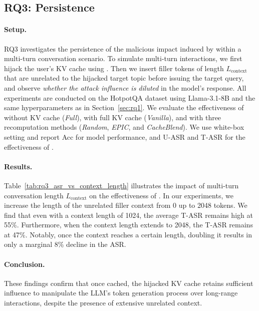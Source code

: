 \subsection{RQ3: Persistence}

\paragraph{Setup.} 
RQ3 investigates the persistence of the malicious impact induced by \sys within a multi-turn conversation scenario. 
% 
To simulate multi-turn interactions, we first hijack the user's KV cache using \sys. Then we insert filler tokens of length $L_\mathrm{context}$ that are unrelated to the hijacked target topic before issuing the target query, and observe \emph{whether the attack influence is diluted} in the model's response.
% 
All experiments are conducted on the HotpotQA dataset using Llama-3.1-8B and the same hyperparameters as in Section~\ref{sec:rq1}. 
% 
We evaluate the effectiveness of \sys without KV cache (\textit{Full}), with full KV cache (\textit{Vanilla}), and with three recomputation methods (\textit{Random}, \textit{EPIC}, and \textit{CacheBlend}). We use white-box setting and report Acc for model performance, and U-ASR and T-ASR for the effectiveness of \sys.

\paragraph{Results.} 
Table~\ref{tab:rq3_asr_vs_context_length} illustrates the impact of multi-turn conversation length $L_{\text{context}}$ on the effectiveness of \sys. In our experiments, we increase the length of the unrelated filler context from 0 up to 2048 tokens. We find that even with a context length of 1024, the average T-ASR remains high at 55\%. Furthermore, when the context length extends to 2048, the T-ASR remains at 47\%. Notably, once the context reaches a certain length, doubling it results in only a marginal 8\% decline in the ASR.

\paragraph{Conclusion.} 
These findings confirm that once cached, the hijacked KV cache retains sufficient influence to manipulate the LLM's token generation process over long-range interactions, despite the presence of extensive unrelated context. 